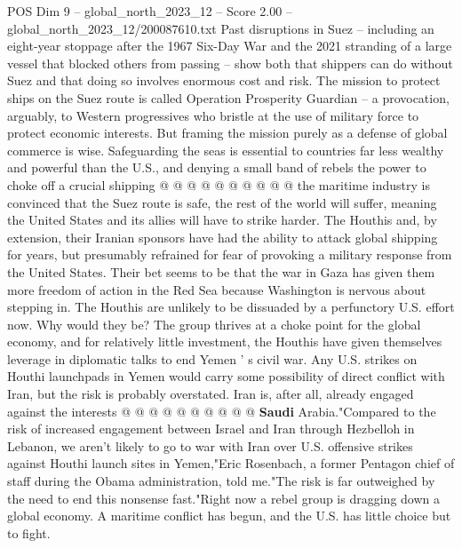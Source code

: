 \begin{textsample}{POS Dim 9 – global\_north\_2023\_12 – Score 2.00 – global\_north\_2023\_12/200087610.txt}
Past disruptions in Suez -- including an eight-year stoppage after the 1967 Six-Day War and the 2021 stranding of a large vessel that blocked others from passing -- show both that shippers can do without Suez and that doing so involves enormous cost and risk.
The mission to protect ships on the Suez route is called Operation Prosperity Guardian -- a provocation, arguably, to Western progressives who bristle at the use of military force to protect economic interests.
But framing the mission purely as a defense of global commerce is wise.
Safeguarding the seas is essential to countries far less wealthy and powerful than the U.S., and denying a small band of rebels the power to choke off a crucial shipping @ @ @ @ @ @ @ @ @ @ the maritime industry is convinced that the Suez route is safe, the rest of the world will suffer, meaning the United States and its allies will have to strike harder.
The Houthis and, by extension, their Iranian sponsors have had the ability to attack global shipping for years, but presumably refrained for fear of provoking a military response from the United States.
Their bet seems to be that the war in Gaza has given them more freedom of action in the Red Sea because Washington is nervous about stepping in.
The Houthis are unlikely to be dissuaded by a perfunctory U.S. effort now.
Why would they be?
The group thrives at a choke point for the global economy, and for relatively little investment, the Houthis have given themselves leverage in diplomatic talks to end Yemen ' s civil war.
Any U.S. strikes on Houthi launchpads in Yemen would carry some possibility of direct conflict with Iran, but the risk is probably overstated.
Iran is, after all, already engaged against the interests @ @ @ @ @ @ @ @ @ @ \textbf{Saudi} Arabia."Compared to the risk of increased engagement between Israel and Iran through Hezbelloh in Lebanon, we aren't likely to go to war with Iran over U.S. offensive strikes against Houthi launch sites in Yemen,"Eric Rosenbach, a former Pentagon chief of staff during the Obama administration, told me."The risk is far outweighed by the need to end this nonsense fast."Right now a rebel group is dragging down a global economy.
A maritime conflict has begun, and the U.S. has little choice but to fight.

\end{textsample}
